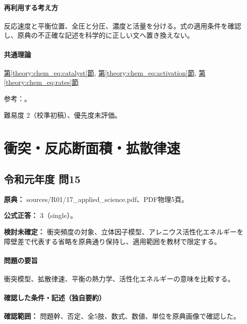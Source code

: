 \paragraph{再利用する考え方} 反応速度と平衡位置、全圧と分圧、濃度と活量を分ける。式の適用条件を確認し、原典の不正確な記述を科学的に正しい文へ置き換えない。

\paragraph{共通理論} \hyperref[theory:chem_eq:catalyst]{第\ref*{theory:chem_eq:catalyst}節}, \hyperref[theory:chem_eq:activation]{第\ref*{theory:chem_eq:activation}節}, \hyperref[theory:chem_eq:rates]{第\ref*{theory:chem_eq:rates}節}

\par 参考：\cite{iupac_greenbook2012}。

\par 難易度 2（校準初稿）、優先度未評価。

\section{衝突・反応断面積・拡散律速}

\subsection{令和元年度 問15}
\label{q:r01-reg-applied-15}

\noindent\textbf{原典：} sources/R01/17\_applied\_science.pdf、PDF物理5頁。

\textbf{公式正答：} 3（single）。

\par\textbf{検討未確定：} 衝突頻度の対象、立体因子模型、アレニウス活性化エネルギーを障壁差で代表する省略を原典通り保持し、適用範囲を教材で限定する。

\paragraph{問題の要旨} 衝突模型、拡散律速、平衡の熱力学、活性化エネルギーの意味を比較する。

\paragraph{確認した条件・記述（独自要約）}\mbox{}\par

\noindent\textbf{確認範囲：} 問題幹、否定、全5肢、数式、数値、単位を原典画像で確認した。\par

